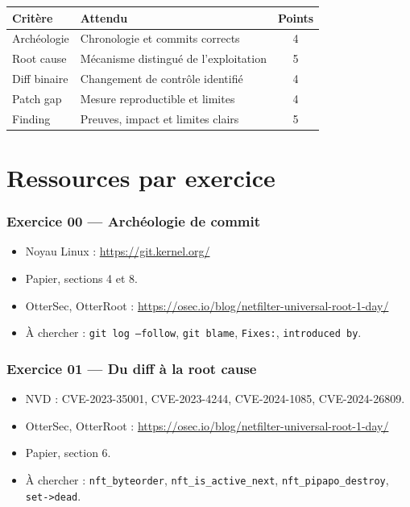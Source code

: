 \documentclass{training}
\begin{document}
\begin{center}
\begin{tabularx}{\linewidth}{|l|X|c|}
\hline
\textbf{Critère} & \textbf{Attendu} & \textbf{Points} \\ \hline
Archéologie & Chronologie et commits corrects & 4 \\ \hline
Root cause & Mécanisme distingué de l'exploitation & 5 \\ \hline
Diff binaire & Changement de contrôle identifié & 4 \\ \hline
Patch gap & Mesure reproductible et limites & 4 \\ \hline
Finding & Preuves, impact et limites clairs & 5 \\ \hline
\end{tabularx}
\end{center}

\chapter{Ressources par exercice}

\subsection*{Exercice 00 --- Archéologie de commit}
\begin{itemize}
  \item Noyau Linux : \url{https://git.kernel.org/}
  \item Papier, sections 4 et 8.
  \item OtterSec, OtterRoot :
        \url{https://osec.io/blog/netfilter-universal-root-1-day/}
  \item À chercher : \texttt{git log --follow}, \texttt{git blame},
        \texttt{Fixes:}, \texttt{introduced by}.
\end{itemize}

\subsection*{Exercice 01 --- Du diff à la root cause}
\begin{itemize}
  \item NVD : CVE-2023-35001, CVE-2023-4244, CVE-2024-1085,
        CVE-2024-26809.
  \item OtterSec, OtterRoot :
        \url{https://osec.io/blog/netfilter-universal-root-1-day/}
  \item Papier, section 6.
  \item À chercher : \texttt{nft\_byteorder}, \texttt{nft\_is\_active\_next},
        \texttt{nft\_pipapo\_destroy}, \texttt{set->dead}.
\end{itemize}
\end{document}
